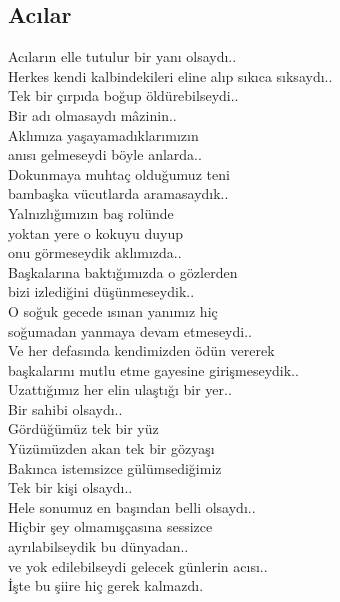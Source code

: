 \subsection{Acılar}

Acıların elle tutulur bir yanı olsaydı.. \\
Herkes kendi kalbindekileri eline alıp sıkıca sıksaydı.. \\
Tek bir çırpıda boğup öldürebilseydi.. \\
Bir adı olmasaydı mâzinin.. \\
Aklımıza yaşayamadıklarımızın \\
anısı gelmeseydi böyle anlarda.. \\
Dokunmaya muhtaç olduğumuz teni \\
bambaşka vücutlarda aramasaydık.. \\
Yalnızlığımızın baş rolünde \\
yoktan yere o kokuyu duyup \\
onu görmeseydik aklımızda.. \\
Başkalarına baktığımızda o gözlerden \\
bizi izlediğini düşünmeseydik.. \\
O soğuk gecede ısınan yanımız hiç \\
soğumadan yanmaya devam etmeseydi.. \\
Ve her defasında kendimizden ödün vererek \\
başkalarını mutlu etme gayesine girişmeseydik.. \\
Uzattığımız her elin ulaştığı bir yer.. \\
Bir sahibi olsaydı.. \\
Gördüğümüz tek bir yüz \\
Yüzümüzden akan tek bir gözyaşı \\
Bakınca istemsizce gülümsediğimiz \\
Tek bir kişi olsaydı.. \\
Hele sonumuz en başından belli olsaydı.. \\
Hiçbir şey olmamışçasına sessizce \\
ayrılabilseydik bu dünyadan.. \\
ve yok edilebilseydi gelecek günlerin acısı.. \\
İşte bu şiire hiç gerek kalmazdı.